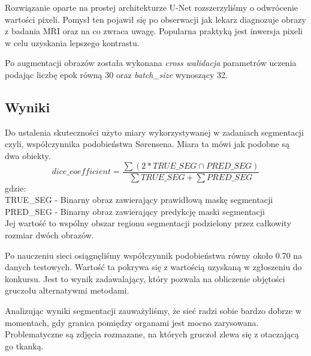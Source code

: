 \documentclass[a4paper,11pt,twoside]{report}
\theoremstyle{definition}
\begin{document}
Rozwiązanie oparte na prostej architekturze U-Net rozszerzyliśmy o odwrócenie wartości pixeli. Pomysł ten pojawił się po obserwacji jak lekarz diagnozuje obrazy z badania MRI oraz na co zwraca uwagę. Popularna praktyką jest inwersja pixeli w celu uzyskania lepszego kontrastu.

Po augmentacji obrazów została wykonana \textit{cross walidacja} parametrów uczenia podając liczbę epok równą 30 oraz \textit{batch\_size} wynoszący 32.

\subsection{Wyniki}

Do ustalenia skuteczności użyto miary wykorzystywanej w zadaniach segmentacji czyli, współczynnika podobieństwa Sørensena. Miara ta mówi jak podobne są dwa obiekty. 
\[dice\_coefficient =  \dfrac { \sum (2 * TRUE\_SEG \cap PRED\_SEG) }  { \sum TRUE\_SEG +  \sum PRED\_SEG} \]
gdzie: \\
TRUE\_SEG - Binarny obraz zawierający prawidłową maskę segmentacji \\
PRED\_SEG - Binarny obraz zawierający predykcję maski segmentacji \\
Jej wartość to wspólny obszar regionu segmentacji podzielony przez całkowity rozmiar dwóch obrazów.


Po nauczeniu sieci osiągnęliśmy współczynnik podobieństwa równy około 0.70 na danych testowych. Wartość ta pokrywa się z wartością uzyskaną w zgłoszeniu do konkursu. Jest to wynik zadawalający, który pozwala na obliczenie objętości gruczołu alternatywmi metodami.

\par

Analizując wyniki segmentacji zauważyliśmy, że sieć radzi sobie bardzo dobrze w momentach, gdy granica pomiędzy organami jest mocno zarysowana. Problematyczne są zdjęcia rozmazane, na których gruczoł zlewa się z otaczającą go tkanką.
\end{document}

